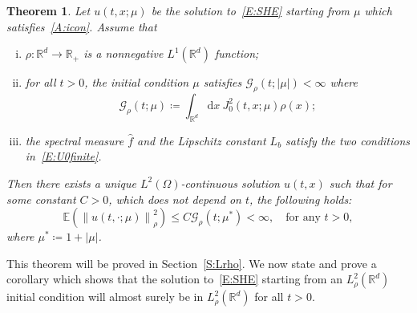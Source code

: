 \documentclass[sn-mathphys]{sn-jnl}%
\renewcommand{\R}{\mathbb{R}}
\newcommand{\E}{\mathbb{E}}
\newcommand{\Norm}[1]{\left\| #1 \right\|}
\newcommand{\ud}{\ensuremath{\mathrm{d}}}
\numberwithin{equation}{section}
\theoremstyle{thmstyleone}%
\newtheorem{theorem}{Theorem}[section]%
\theoremstyle{thmstyletwo}%
\theoremstyle{thmstylethree}%
\begin{document}
\begin{theorem}\label{T:Lrho}
  Let $u(t,x;\mu)$ be the solution to~\eqref{E:SHE} starting from $\mu$ which
  satisfies~\eqref{A:icon}. Assume that
  \begin{enumerate}[(i)]
    \item $\rho: \R^d \to \R_+$ is a nonnegative $L^1 (\R^d)$ function;
    \item for all $t > 0$, the initial condition $\mu$ satisfies $\mathcal{G}_{\rho}(t;\lvert\mu\rvert) <
      \infty$ where
      \begin{equation}\label{E:G}
        \mathcal{G}_{\rho}(t;\mu)
        \coloneqq \int_{\R^d} \ud x\: J_0^2\left(t,x;\mu\right) \rho(x);
      \end{equation}
    \item the spectral measure $\widehat{f}$ and the Lipschitz constant $L_b$ satisfy the two
      conditions in~\eqref{E:U0finite}.
  \end{enumerate}
  Then there exists a unique $L^2 (\Omega)$-continuous solution $u(t,x)$ such that for some constant
  $C>0$, which does not depend on $t$, the following holds:
  \begin{equation}\label{E:uInLrho}
    \E\left(\Norm{u(t,\cdot; \mu)}_{\rho}^2\right)
    \le C \mathcal{G}_{\rho}(t; \mu^*)
    < \infty, \quad \text{for any $t > 0$},
  \end{equation}
  where $ \mu^* \coloneqq 1 + \lvert\mu\rvert$.
\end{theorem}

This theorem will be proved in Section~\ref{S:Lrho}. We now state and prove a corollary which shows
that the solution to~\eqref{E:SHE} starting from an $L^2_{\rho}(\R^d)$ initial condition will almost
surely be in $L^2_{\rho}(\R^d)$ for all $t >0$.
\end{document}

